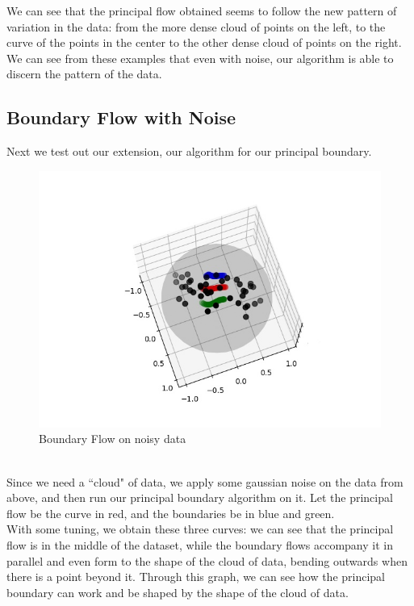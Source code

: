 \documentclass[12pt]{report}
\begin{document}
We can see that the principal flow obtained seems to follow the new pattern 
of variation in the data: from the more dense cloud of points on the left, to the curve of
the points in the center to the other dense cloud of points on the right.
We can see from these examples that even with noise, our algorithm is able to discern 
the pattern of the data.

\subsection{Boundary Flow with Noise}
Next we test out our extension, our algorithm for our principal boundary.
\begin{figure}[ht]
    \begin{center}
        \includegraphics[scale=0.45]{noisy_boundary_flow13.jpg}
        \caption{Boundary Flow on noisy data}
        \label{fig:boundaryflows}
    \end{center}
\end{figure}\\
Since we need a ``cloud" of data, we apply some gaussian noise on the data from above,
and then run our principal boundary algorithm on it. Let the principal flow
be the curve in red, and the boundaries be in blue and green.\\
With some tuning, we obtain these three curves: we can see that the principal flow
is in the middle of the dataset, while the boundary flows accompany it in parallel
and even form to the shape of the cloud of data, bending outwards
when there is a point beyond it. Through this graph, we can see how the principal
boundary can work and be shaped by the shape of the cloud of data.
\end{document}
